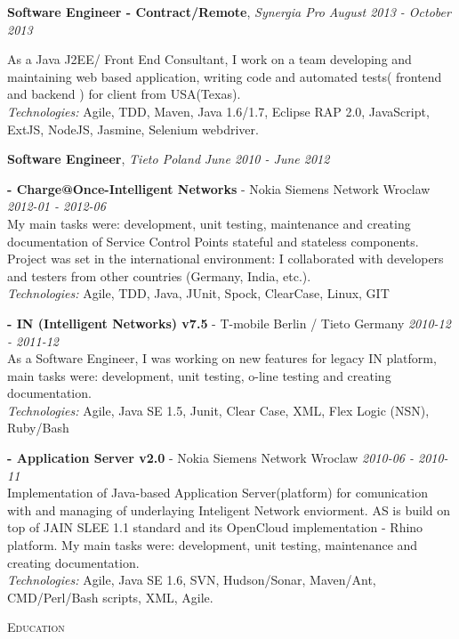 \documentclass[9pt]{article}
\newenvironment{changemargin}[2]{%
  \begin{list}{}{%
      \setlength{\topsep}{0pt}%
      \setlength{\leftmargin}{#1}%
      \setlength{\rightmargin}{#2}%
      \setlength{\listparindent}{\parindent}%
      \setlength{\itemindent}{\parindent}%
      \setlength{\parsep}{\parskip}%
    }%
  \item[]}{\end{list}
}
\newcommand{\lineover}{
  \begin{changemargin}{-0.05in}{-0.05in}
    \vspace*{-8pt}
    \hrulefill \\
    \vspace*{-2pt}
  \end{changemargin}
}
\newcommand{\header}[1]{
	\begin{changemargin}{-0.5in}{-0.5in}
		\scshape{#1}\\
  	\lineover
	\end{changemargin}
}
\newcommand{\jobtitle}[3]{
	\textbf{#1}, \emph{#2} \hfill \emph{#3}\\
}
\newcommand{\jobdescription}[1]{
	\begin{changemargin}{0.15in}{0.15in}
    \smallskip
		{#1}
    \medskip
	\end{changemargin}
}
\newenvironment{body} {
	\vspace*{-16pt}
	\begin{changemargin}{-0.25in}{-0.5in}
  }
	{\end{changemargin}
}
\begin{document}
\begin{body}
  \jobtitle{Software Engineer - Contract/Remote}{Synergia Pro}{August 2013 - October 2013}{}
  \jobdescription{
    As a Java J2EE/ Front End Consultant, I work on a team developing and maintaining web based application, writing code and automated tests( frontend and backend ) for client from USA(Texas).\\
    \emph{Technologies:} Agile, TDD, Maven, Java 1.6/1.7, Eclipse RAP 2.0, JavaScript, ExtJS, NodeJS, Jasmine, Selenium webdriver.
  }

  \jobtitle{Software Engineer}{Tieto Poland}{June 2010 - June 2012}
  \jobdescription{
    \medskip

    \textbf{- Charge@Once-Intelligent Networks} - Nokia Siemens Network Wroclaw{} \hfill \emph{2012-01 - 2012-06}{} \\
    My main tasks were: development, unit testing, maintenance and creating documentation of Service Control Points stateful and stateless components. Project was set in the international environment: I collaborated with developers and testers from other countries (Germany, India, etc.).\\
    \emph{Technologies:} Agile, TDD, Java, JUnit, Spock, ClearCase, Linux, GIT
    \medskip

    \textbf{- IN (Intelligent Networks) v7.5} - T-mobile Berlin / Tieto Germany{} \hfill \emph{2010-12 - 2011-12}{} \\
    As a Software Engineer, I was working on new features for legacy IN platform, main tasks were: development, unit testing, o-line testing and creating documentation.\\
    \emph{Technologies:} Agile, Java SE 1.5, Junit, Clear Case, XML, Flex Logic (NSN), Ruby/Bash
    \medskip

    \textbf{- Application Server v2.0} - Nokia Siemens Network Wroclaw{} \hfill \emph{2010-06 - 2010-11}{} \\
    Implementation of Java-based Application Server(platform) for comunication with and managing of underlaying Inteligent Network enviorment. AS is build on top of JAIN SLEE 1.1 standard and its OpenCloud implementation - Rhino platform. My main tasks were: development, unit testing, maintenance and creating documentation.\\
    \emph{Technologies:} Agile, Java SE 1.6, SVN, Hudson/Sonar, Maven/Ant, CMD/Perl/Bash scripts, XML, Agile.
  }

\end{body}
\medskip


\header{Education}
\end{document}
